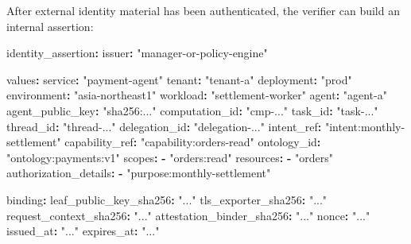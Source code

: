 \documentclass[
]{article}
\newenvironment{Shaded}{}{}
\newcommand{\AttributeTok}[1]{\textcolor[rgb]{0.49,0.56,0.16}{#1}}
\newcommand{\FunctionTok}[1]{\textcolor[rgb]{0.02,0.16,0.49}{#1}}
\newcommand{\KeywordTok}[1]{\textcolor[rgb]{0.00,0.44,0.13}{\textbf{#1}}}
\newcommand{\StringTok}[1]{\textcolor[rgb]{0.25,0.44,0.63}{#1}}
\begin{document}
After external identity material has been authenticated, the verifier
can build an internal assertion:

\begin{Shaded}
\begin{Highlighting}[]
\FunctionTok{identity\_assertion}\KeywordTok{:}
\AttributeTok{  }\FunctionTok{issuer}\KeywordTok{:}\AttributeTok{ }\StringTok{"manager{-}or{-}policy{-}engine"}

\AttributeTok{  }\FunctionTok{values}\KeywordTok{:}
\AttributeTok{    }\FunctionTok{service}\KeywordTok{:}\AttributeTok{ }\StringTok{"payment{-}agent"}
\AttributeTok{    }\FunctionTok{tenant}\KeywordTok{:}\AttributeTok{ }\StringTok{"tenant{-}a"}
\AttributeTok{    }\FunctionTok{deployment}\KeywordTok{:}\AttributeTok{ }\StringTok{"prod"}
\AttributeTok{    }\FunctionTok{environment}\KeywordTok{:}\AttributeTok{ }\StringTok{"asia{-}northeast1"}
\AttributeTok{    }\FunctionTok{workload}\KeywordTok{:}\AttributeTok{ }\StringTok{"settlement{-}worker"}
\AttributeTok{    }\FunctionTok{agent}\KeywordTok{:}\AttributeTok{ }\StringTok{"agent{-}a"}
\AttributeTok{    }\FunctionTok{agent\_public\_key}\KeywordTok{:}\AttributeTok{ }\StringTok{"sha256:..."}
\AttributeTok{    }\FunctionTok{computation\_id}\KeywordTok{:}\AttributeTok{ }\StringTok{"cmp{-}..."}
\AttributeTok{    }\FunctionTok{task\_id}\KeywordTok{:}\AttributeTok{ }\StringTok{"task{-}..."}
\AttributeTok{    }\FunctionTok{thread\_id}\KeywordTok{:}\AttributeTok{ }\StringTok{"thread{-}..."}
\AttributeTok{    }\FunctionTok{delegation\_id}\KeywordTok{:}\AttributeTok{ }\StringTok{"delegation{-}..."}
\AttributeTok{    }\FunctionTok{intent\_ref}\KeywordTok{:}\AttributeTok{ }\StringTok{"intent:monthly{-}settlement"}
\AttributeTok{    }\FunctionTok{capability\_ref}\KeywordTok{:}\AttributeTok{ }\StringTok{"capability:orders{-}read"}
\AttributeTok{    }\FunctionTok{ontology\_id}\KeywordTok{:}\AttributeTok{ }\StringTok{"ontology:payments:v1"}
\AttributeTok{    }\FunctionTok{scopes}\KeywordTok{:}
\AttributeTok{      }\KeywordTok{{-}}\AttributeTok{ }\StringTok{"orders:read"}
\AttributeTok{    }\FunctionTok{resources}\KeywordTok{:}
\AttributeTok{      }\KeywordTok{{-}}\AttributeTok{ }\StringTok{"orders"}
\AttributeTok{    }\FunctionTok{authorization\_details}\KeywordTok{:}
\AttributeTok{      }\KeywordTok{{-}}\AttributeTok{ }\StringTok{"purpose:monthly{-}settlement"}

\AttributeTok{  }\FunctionTok{binding}\KeywordTok{:}
\AttributeTok{    }\FunctionTok{leaf\_public\_key\_sha256}\KeywordTok{:}\AttributeTok{ }\StringTok{"..."}
\AttributeTok{    }\FunctionTok{tls\_exporter\_sha256}\KeywordTok{:}\AttributeTok{ }\StringTok{"..."}
\AttributeTok{    }\FunctionTok{request\_context\_sha256}\KeywordTok{:}\AttributeTok{ }\StringTok{"..."}
\AttributeTok{    }\FunctionTok{attestation\_binder\_sha256}\KeywordTok{:}\AttributeTok{ }\StringTok{"..."}
\AttributeTok{    }\FunctionTok{nonce}\KeywordTok{:}\AttributeTok{ }\StringTok{"..."}
\AttributeTok{    }\FunctionTok{issued\_at}\KeywordTok{:}\AttributeTok{ }\StringTok{"..."}
\AttributeTok{    }\FunctionTok{expires\_at}\KeywordTok{:}\AttributeTok{ }\StringTok{"..."}
\end{Highlighting}
\end{Shaded}
\end{document}
